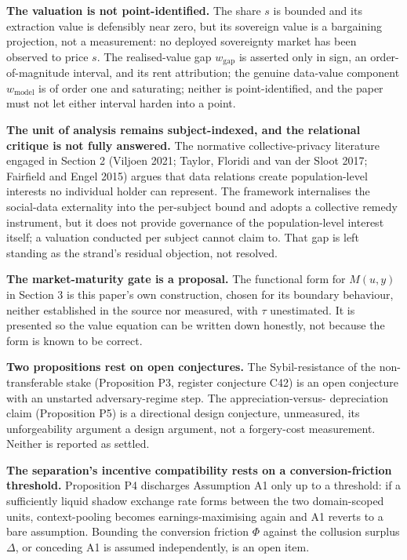 \documentclass[
  11pt,
]{article}
\begin{document}
\textbf{The valuation is not point-identified.} The share \(s\) is
bounded and its extraction value is defensibly near zero, but its
sovereign value is a bargaining projection, not a measurement: no
deployed sovereignty market has been observed to price \(s\). The
realised-value gap \(w_{\text{gap}}\) is asserted only in sign, an
order-of-magnitude interval, and its rent attribution; the genuine
data-value component \(w_{\text{model}}\) is of order one and
saturating; neither is point-identified, and the paper must not let
either interval harden into a point.

\textbf{The unit of analysis remains subject-indexed, and the relational
critique is not fully answered.} The normative collective-privacy
literature engaged in Section 2 (Viljoen 2021; Taylor, Floridi and van
der Sloot 2017; Fairfield and Engel 2015) argues that data relations
create population-level interests no individual holder can represent.
The framework internalises the social-data externality into the
per-subject bound and adopts a collective remedy instrument, but it does
not provide governance of the population-level interest itself; a
valuation conducted per subject cannot claim to. That gap is left
standing as the strand's residual objection, not resolved.

\textbf{The market-maturity gate is a proposal.} The functional form for
\(M(u,y)\) in Section 3 is this paper's own construction, chosen for its
boundary behaviour, neither established in the source nor measured, with
\(\tau\) unestimated. It is presented so the value equation can be
written down honestly, not because the form is known to be correct.

\textbf{Two propositions rest on open conjectures.} The Sybil-resistance
of the non-transferable stake (Proposition P3, register conjecture C42)
is an open conjecture with an unstarted adversary-regime step. The
appreciation-versus- depreciation claim (Proposition P5) is a
directional design conjecture, unmeasured, its unforgeability argument a
design argument, not a forgery-cost measurement. Neither is reported as
settled.

\textbf{The separation's incentive compatibility rests on a
conversion-friction threshold.} Proposition P4 discharges Assumption A1
only up to a threshold: if a sufficiently liquid shadow exchange rate
forms between the two domain-scoped units, context-pooling becomes
earnings-maximising again and A1 reverts to a bare assumption. Bounding
the conversion friction \(\Phi\) against the collusion surplus
\(\Delta\), or conceding A1 is assumed independently, is an open item.
\end{document}
